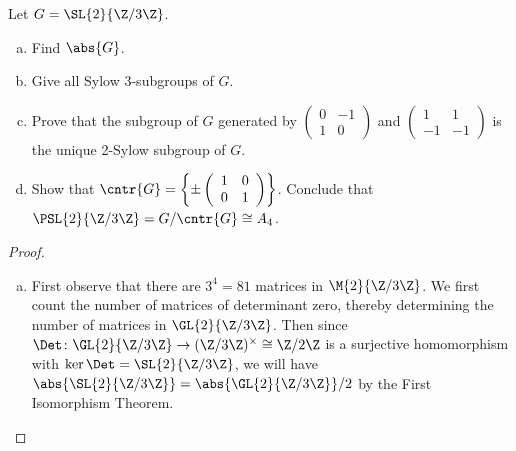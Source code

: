 \documentclass[10pt]{amsart}
\begin{document}
\begin{thm}
  Let $G = \SL{2}{\Z/3\Z}$.
  \begin{enumerate}[(a)]
  \item
    Find $\abs{G}$.
  \item
    Give all Sylow 3-subgroups of $G$.
  \item
    Prove that the subgroup of $G$ generated by 
    $\left(\begin{array}{cc}
      0 & -1\\
      1 & 0
    \end{array}\right)$ and 
    $\left(\begin{array}{cc}
      1 & 1\\
      -1 & -1
    \end{array}\right)$ 
    is the unique 2-Sylow subgroup of $G$.
  \item
    Show that $\cntr{G} = \left\{\pm \left(\begin{array}{cc}
      1 & 0\\
      0 & 1\\
    \end{array}\right)\right\}$.
    Conclude that $\PSL{2}{\Z/3\Z} = G/\cntr{G} \cong A_4$.
  \end{enumerate}
  \begin{proof}
    \begin{enumerate}[(a)]
    \item
      First observe that there are $3^4 = 81$ matrices in $\M{2}{\Z/3\Z}$.
      We first count the number of matrices of determinant zero, thereby determining the number of matrices in $\GL{2}{\Z/3\Z}$.  
      Then since $\Det \colon \GL{2}{\Z/3\Z} \rightarrow (\Z/3\Z)^\times \cong \Z/2\Z$ is a surjective homomorphism with $\ker\Det = \SL{2}{\Z/3\Z}$, we will have $\abs{\SL{2}{\Z/3\Z}} = \abs{\GL{2}{\Z/3\Z}}/2$ by the First Isomorphism Theorem.


\end{enumerate}
\end{proof}
\end{thm}
\end{document}
